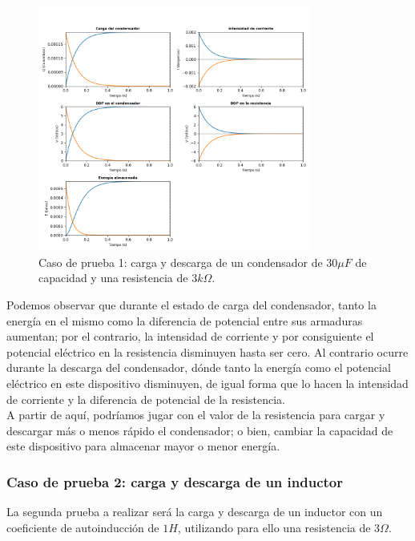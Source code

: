 \documentclass[../main.tex]{subfiles}
\begin{document}
\begin{figure}[!h]
    \centering
    \includegraphics[width=0.8\textwidth]{images/caso_prueba_rc_1.png}
    \caption{Caso de prueba 1: carga y descarga de un condensador de $30\mu F$ de capacidad y una resistencia de $3k\Omega$.}
    \label{fig::caso_prueba_rc_1_res}
\end{figure}

Podemos observar que durante el estado de carga del condensador, tanto la energía en el mismo como la diferencia de potencial entre sus armaduras aumentan; por el contrario, la intensidad de corriente y por consiguiente el potencial eléctrico en la resistencia disminuyen hasta ser cero. Al contrario ocurre durante la descarga del condensador, dónde tanto la energía como el potencial eléctrico en este dispositivo disminuyen, de igual forma que lo hacen la intensidad de corriente y la diferencia de potencial de la resistencia.\\

A partir de aquí, podríamos jugar con el valor de la resistencia para cargar y descargar más o menos rápido el condensador; o bien, cambiar la capacidad de este dispositivo para almacenar mayor o menor energía.



\subsubsection{Caso de prueba 2: carga y descarga de un inductor}
La segunda prueba a realizar será la carga y descarga de un inductor con un coeficiente de autoinducción de $1H$, utilizando para ello una resistencia de $3\Omega$. \\
\end{document}
